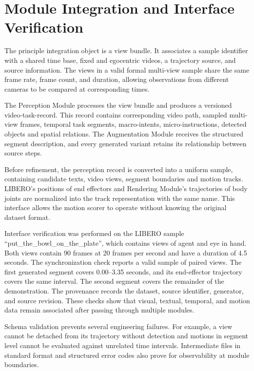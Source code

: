 \documentclass[11pt,oneside]{report}
\begin{document}
\section{Module Integration and Interface Verification}

The principle integration object is a view bundle. It associates a sample identifier with a shared time base, fixed and egocentric videos, a trajectory source, and source information. The views in a valid formal multi-view sample share the same frame rate, frame count, and duration, allowing observations from different cameras to be compared at corresponding times.

The Perception Module processes the view bundle and produces a versioned video-task-record. This record contains corresponding video path, sampled multi-view frames, temporal task segments, macro-intents, micro-instructions, detected objects and spatial relations. The Augmentation Module receives the structured segment description, and every generated variant retains its relationship between source steps.

Before refinement, the perception record is converted into a uniform sample, containing candidate texts, video views, segment boundaries and motion tracks. LIBERO’s positions of end effectors and Rendering Module’s trajectories of body joints are normalized into the track representation with the same name. This interface allows the motion scorer to operate without knowing the original dataset format.

Interface verification was performed on the LIBERO sample “put\_the\_bowl\_on\_the\_plate”, which contains views of agent and eye in hand. Both views contain 90 frames at 20 frames per second and have a duration of 4.5 seconds. The synchronization check reports a valid sample of paired views. The first generated segment covers 0.00–3.35 seconds, and its end-effector trajectory covers the same interval. The second segment covers the remainder of the demonstration. The provenance records the dataset, source identifier, generator, and source revision. These checks show that visual, textual, temporal, and motion data remain associated after passing through multiple modules.

Schema validation prevents several engineering failures. For example, a view cannot be detached from its trajectory without detection and motions in segment level cannot be evaluated against unrelated time intervals. Intermediate files in standard format and structured error codes also prove for observability at module boundaries.
\end{document}
